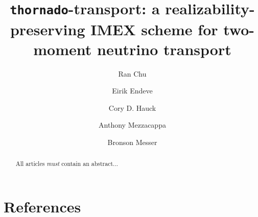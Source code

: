 \documentclass[a4paper]{jpconf}
\begin{document}
\title{\texttt{thornado}-transport: a realizability-preserving IMEX scheme for two-moment neutrino transport}

\author{Ran Chu}
\address{Department of Physics and Astronomy, University of Tennessee Knoxville, TN 37996-1200}

\author{Eirik Endeve}
\address{Department of Physics and Astronomy, University of Tennessee Knoxville, TN 37996-1200}
\address{Computational and Applied Mathematics Group, Oak Ridge National Laboratory, Oak Ridge, TN 37831 USA}

\author{Cory D. Hauck}
\address{Department of Mathematics, University of Tennessee Knoxville, TN 37996-1320}
\address{Computational and Applied Mathematics Group, Oak Ridge National Laboratory, Oak Ridge, TN 37831 USA}

\author{Anthony Mezzacappa}
\address{Department of Physics and Astronomy, University of Tennessee Knoxville, TN 37996-1200}

\author{Bronson Messer}
\address{Department of Physics and Astronomy, University of Tennessee Knoxville, TN 37996-1200}
\address{Scientific Computing and Theoretical Physics Groups, Oak Ridge National Laboratory, Oak Ridge, TN 37831 USA}

\begin{abstract}
All articles {\it must} contain an abstract...
\end{abstract}








\section*{References}

\end{document}
